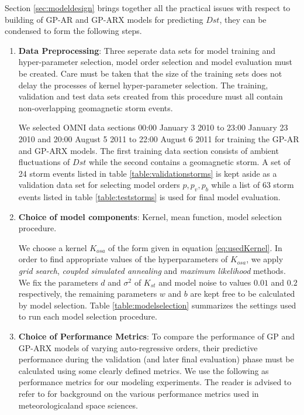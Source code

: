 \documentclass{article}
\begin{document}
Section \ref{sec:modeldesign} brings together all the practical issues
with respect to building of GP-AR and GP-ARX models for predicting
$Dst$, they can be condensed to form the following steps.

\begin{enumerate}

\item \textbf{Data Preprocessing}: Three seperate data sets for model
  training and hyper-parameter selection, model order selection and
  model evaluation must be created. Care must be taken that the size
  of the training sets does not delay the processes of kernel
  hyper-parameter selection. The training, validation and test data
  sets created from this procedure must all contain non-overlapping
  geomagnetic storm events. 

  We selected OMNI data sections 00:00 January 3 2010 to 23:00 January
  23 2010 and 20:00 August 5 2011 to 22:00 August 6 2011 for training
  the GP-AR and GP-ARX models. The first training data section
  consists of ambient fluctuations of $Dst$ while the second contains
  a geomagnetic storm. A set of 24 storm events listed in table
  \ref{table:validationstorms} is kept aside as a validation data set
  for selecting model orders $p, p_v, p_b$ while a list of 63 storm
  events listed in table \ref{table:teststorms} is used for final
  model evaluation.


\item \textbf{Choice of model components}:  Kernel, mean function, model selection procedure. 

  We choose a kernel $K_{osa}$ of the form given in equation
  \ref{eq:usedKernel}. In order to find appropriate values of the
  hyperparameters of $K_{osa}$, we apply \emph{grid search},
  \emph{coupled simulated annealing} and \emph{maximum likelihood}
  methods. We fix the parameters $d$ and $\sigma^2$ of $K_{st}$ and
  model noise to values $0.01$ and $0.2$ respectively, the remaining
  parameters $w$ and $b$ are kept free to be calculated by model
  selection. Table \ref{table:modelselection} summarizes the settings
  used to run each model selection procedure.

\item \textbf{Choice of Performance Metrics}: To compare the
  performance of GP and GP-ARX models of varying auto-regressive
  orders, their predictive performance during the validation (and
  later final evaluation) phase must be calculated using some clearly
  defined metrics. We use the following as performance metrics for our
  modeling experiments. The reader is advised to refer to
  \citet{wilks2011statistical} for background on the various
  performance metrics used in meteorologicaland space sciences.


\end{enumerate}
\end{document}
